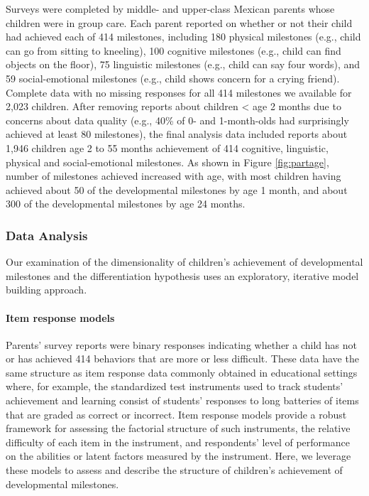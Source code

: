 \documentclass[man, floatsintext]{apa7}
\begin{document}
Surveys were completed by
middle- and upper-class Mexican parents whose children were in group
care. Each parent reported on whether or not
their child had achieved each of 414 milestones, including 180
physical milestones (e.g., child can go from sitting to kneeling), 100
cognitive milestones (e.g., child can find objects on the floor), 75
linguistic milestones (e.g., child can say four words), and 59
social-emotional milestones (e.g., child shows concern for a crying
friend). Complete data with no missing responses for all 414 milestones we available for 2,023 children. After removing reports about children < age 2 months due to concerns about data quality (e.g., 40\% of 0- and 1-month-olds had surprisingly achieved at least 80
milestones), the final analysis data included reports about 1,946 children age 2 to 55
months achievement of 414 cognitive, linguistic, physical and
social-emotional milestones. As shown in Figure \ref{fig:partage}, number of milestones achieved increased with age, with most
children having achieved about 50 of the developmental milestones by age 1 month, and about 300 of the developmental milestones by age 24 months.


\subsubsection{Data Analysis}

Our examination of the dimensionality of children's achievement of developmental milestones  and the differentiation hypothesis uses an exploratory, iterative model building approach.

\paragraph{Item response models}

Parents' survey reports were binary responses indicating whether a child has not or has achieved 414 behaviors that are more or less difficult. These data have the same structure as item response data commonly obtained in educational settings where, for example, the standardized test instruments used to track students' achievement and learning consist of students' responses to long batteries of items that are graded as correct or incorrect. Item response models provide a robust framework for assessing the factorial structure of such instruments, the relative difficulty of each item in the instrument, and respondents' level of performance on the abilities or latent factors measured by the instrument. Here, we leverage these models to assess and describe the structure of children's achievement of developmental milestones.
\end{document}
